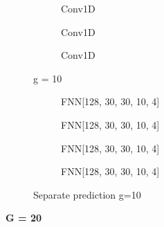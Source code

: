 \documentclass[a4paper,times,12pt]{article}
\begin{document}
\begin{figure}[H]
    \centering
    \begin{subfigure}[t]{0.45\textwidth}
		\centering
        
        \caption{Conv1D}
		\label{fig:a}
    \end{subfigure}\hfill
    \begin{subfigure}[t]{0.45\textwidth}
		\centering
        
        \caption{Conv1D}
		\label{fig:b}
    \end{subfigure}\hfill    
    \begin{subfigure}[t]{0.45\textwidth}
        \centering
        
        \caption{Conv1D}
		\label{fig:c}
    \end{subfigure}
	\caption{g = 10}
\end{figure}

\begin{figure}[H]
    \centering
    \begin{subfigure}[t]{0.45\textwidth}
		\centering
        
        \caption{FNN[128, 30, 30, 10, 4]}
		\label{fig:a}
    \end{subfigure}\hfill
    \begin{subfigure}[t]{0.45\textwidth}
		\centering
        
        \caption{FNN[128, 30, 30, 10, 4]}
		\label{fig:b}
    \end{subfigure}\hfill    
    \begin{subfigure}[t]{0.45\textwidth}
        \centering
        
        \caption{FNN[128, 30, 30, 10, 4]}
		\label{fig:c}
    \end{subfigure}\hfill
    \begin{subfigure}[t]{0.45\textwidth}
        \centering
        
        \caption{FNN[128, 30, 30, 10, 4]}
		\label{fig:c}
    \end{subfigure}
	\caption{Separate prediction  g=10}
\end{figure}

\textbf{G = 20}
\end{document}
